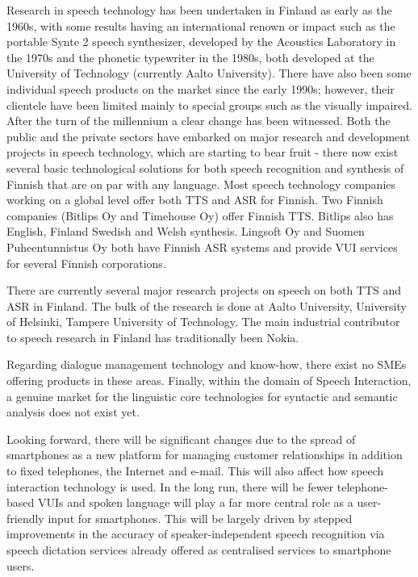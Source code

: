 \documentclass[]{../../metanetpaper}
\begin{document}
\begin{Parallel}[c]{77mm}{77mm}
{Research in speech technology has been undertaken in Finland as early as the
1960s, with some results having an international renown or impact such as the
portable Synte 2 speech synthesizer, developed by the Acoustics Laboratory in
the 1970s and the phonetic typewriter in the 1980s, both developed at the
University of Technology (currently Aalto University). There have also been
some individual speech products on the market since the early 1990s; however,
their clientele have been limited mainly to special groups such as the visually
impaired. After the turn of the millennium a clear change has been witnessed.
Both the public and the private sectors have embarked on major research and
development projects in speech technology, which are starting to bear fruit -
there now exist several basic technological solutions for both speech
recognition and synthesis of Finnish that are on par with any language. Most
speech technology companies working on a global level offer both TTS and ASR
for Finnish. Two Finnish companies (Bitlips Oy and Timehouse Oy) offer Finnish
TTS. Bitlips also has English, Finland Swedish and Welsh synthesis. Lingsoft Oy
and Suomen Puheentunnistus Oy both have Finnish ASR systems and provide VUI
services for several Finnish corporations.

There are currently several major research projects on speech on both TTS and
ASR in Finland. The bulk of the research is done at Aalto University,
University of Helsinki, Tampere University of Technology. The main industrial
contributor to speech research in Finland has traditionally been Nokia.

Regarding dialogue management technology and know-how, there exist no SMEs
offering products in these areas. Finally, within the domain of Speech
Interaction, a genuine market for the linguistic core technologies for
syntactic and semantic analysis does not exist yet.

Looking forward, there will be significant changes due to the spread of
smartphones as a new platform for managing customer relationships in addition
to fixed telephones, the Internet and e-mail. This will also affect how speech
interaction technology is used. In the long run, there will be fewer
telephone-based VUIs and spoken language will play a far more central role as a
user-friendly input for smartphones. This will be largely driven by stepped
improvements in the accuracy of speaker-independent speech recognition via
speech dictation services already offered as centralised services to smartphone
users.
}


\end{Parallel}
\end{document}
